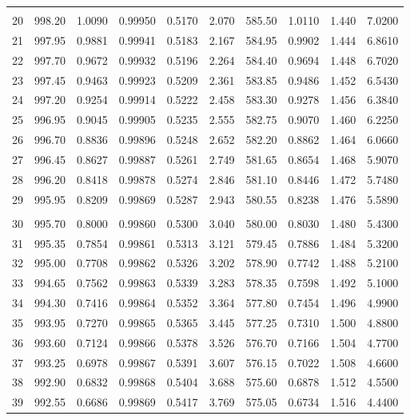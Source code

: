 \documentclass[letter,twosides,10pt]{article}
\begin{document}
\begin{longtable}{|c|c|c|c|c|c|c|c|c|c|}
 & & & & & & & & & \\ 
 20 & 998.20 & 1.0090 & 0.99950 & 0.5170 &  2.070 & 585.50 & 1.0110 & 1.440 &  7.0200 \\
 21 & 997.95 & 0.9881 & 0.99941 & 0.5183 &  2.167 & 584.95 & 0.9902 & 1.444 &  6.8610 \\
 22 & 997.70 & 0.9672 & 0.99932 & 0.5196 &  2.264 & 584.40 & 0.9694 & 1.448 &  6.7020 \\
 23 & 997.45 & 0.9463 & 0.99923 & 0.5209 &  2.361 & 583.85 & 0.9486 & 1.452 &  6.5430 \\
 24 & 997.20 & 0.9254 & 0.99914 & 0.5222 &  2.458 & 583.30 & 0.9278 & 1.456 &  6.3840 \\
 25 & 996.95 & 0.9045 & 0.99905 & 0.5235 &  2.555 & 582.75 & 0.9070 & 1.460 &  6.2250 \\
 26 & 996.70 & 0.8836 & 0.99896 & 0.5248 &  2.652 & 582.20 & 0.8862 & 1.464 &  6.0660 \\
 27 & 996.45 & 0.8627 & 0.99887 & 0.5261 &  2.749 & 581.65 & 0.8654 & 1.468 &  5.9070 \\
 28 & 996.20 & 0.8418 & 0.99878 & 0.5274 &  2.846 & 581.10 & 0.8446 & 1.472 &  5.7480 \\
 29 & 995.95 & 0.8209 & 0.99869 & 0.5287 &  2.943 & 580.55 & 0.8238 & 1.476 &  5.5890 \\
 & & & & & & & & & \\ 
 30 & 995.70 & 0.8000 & 0.99860 & 0.5300 &  3.040 & 580.00 & 0.8030 & 1.480 &  5.4300 \\
 31 & 995.35 & 0.7854 & 0.99861 & 0.5313 &  3.121 & 579.45 & 0.7886 & 1.484 &  5.3200 \\
 32 & 995.00 & 0.7708 & 0.99862 & 0.5326 &  3.202 & 578.90 & 0.7742 & 1.488 &  5.2100 \\
 33 & 994.65 & 0.7562 & 0.99863 & 0.5339 &  3.283 & 578.35 & 0.7598 & 1.492 &  5.1000 \\
 34 & 994.30 & 0.7416 & 0.99864 & 0.5352 &  3.364 & 577.80 & 0.7454 & 1.496 &  4.9900 \\
 35 & 993.95 & 0.7270 & 0.99865 & 0.5365 &  3.445 & 577.25 & 0.7310 & 1.500 &  4.8800 \\
 36 & 993.60 & 0.7124 & 0.99866 & 0.5378 &  3.526 & 576.70 & 0.7166 & 1.504 &  4.7700 \\
 37 & 993.25 & 0.6978 & 0.99867 & 0.5391 &  3.607 & 576.15 & 0.7022 & 1.508 &  4.6600 \\
 38 & 992.90 & 0.6832 & 0.99868 & 0.5404 &  3.688 & 575.60 & 0.6878 & 1.512 &  4.5500 \\
 39 & 992.55 & 0.6686 & 0.99869 & 0.5417 &  3.769 & 575.05 & 0.6734 & 1.516 &  4.4400 \\

\end{longtable}
\end{document}
